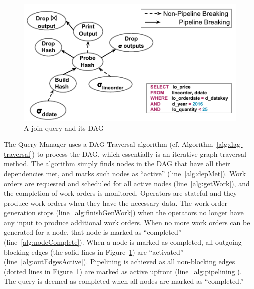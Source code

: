 \begin{figure}[]
	\centering
	\includegraphics[width=\columnwidth]{policy/figures/QueryPlan.pdf}
	\vspace*{-2em}
	\caption{A join query and its DAG}
	\label{fig:dag}
\end{figure}

The Query Manager uses a DAG Traversal algorithm (cf. Algorithm~\ref{alg:dag-traversal}) to process the DAG, which essentially is an iterative graph traversal method. 
The algorithm simply finds nodes in the DAG that have all their dependencies met, and marks such nodes as ``active'' (line~\ref{alg:depMet}).
Work orders are requested and scheduled for all active nodes (line~\ref{alg:getWork}), and 
the completion of work orders is monitored. 
Operators are stateful and they produce work orders when they have the necessary data.
The work order generation stops (line~\ref{alg:finishGenWork}) when the operators no longer have any input to produce additional work orders.
When no more work orders can be generated for a node, that node is marked as 
``completed'' (line~\ref{alg:nodeComplete}). 
When a node is marked as completed, all outgoing blocking edges (the solid lines 
in Figure~\ref{fig:dag}) are ``activated'' (line~\ref{alg:outEdgesActive}). 
Pipelining is achieved as all non-blocking edges (dotted lines in 
Figure~\ref{fig:dag}) are marked as active upfront (line~\ref{alg:pipelining}).
The query is deemed as completed when all nodes are marked as ``completed.''

